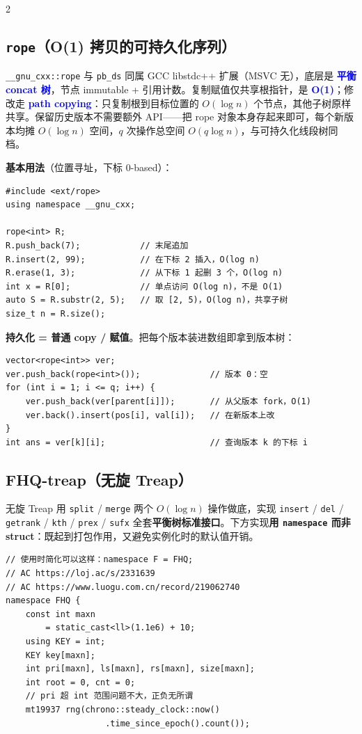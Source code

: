 \begin{multicols*}{2}
		\subsection{\texttt{rope}（O(1) 拷贝的可持久化序列）}

		\verb|__gnu_cxx::rope| 与 \verb|pb_ds| 同属 GCC libstdc++ 扩展（MSVC 无），底层是 \textcolor{blue}{\textbf{平衡 concat 树}}，节点 immutable + 引用计数。复制赋值仅共享根指针，是 \textcolor{blue}{\textbf{O(1)}}；修改走 \textcolor{blue}{\textbf{path copying}}：只复制根到目标位置的 $O(\log n)$ 个节点，其他子树原样共享。保留历史版本不需要额外 API——把 rope 对象本身存起来即可，每个新版本均摊 $O(\log n)$ 空间，$q$ 次操作总空间 $O(q \log n)$，与可持久化线段树同档。

		\textbf{基本用法}（位置寻址，下标 0-based）：

\begin{verbatim}
#include <ext/rope>
using namespace __gnu_cxx;

rope<int> R;
R.push_back(7);            // 末尾追加
R.insert(2, 99);           // 在下标 2 插入，O(log n)
R.erase(1, 3);             // 从下标 1 起删 3 个，O(log n)
int x = R[0];              // 单点访问 O(log n)，不是 O(1)
auto S = R.substr(2, 5);   // 取 [2, 5)，O(log n)，共享子树
size_t n = R.size();
\end{verbatim}

		\textbf{持久化 = 普通 copy / 赋值}。把每个版本装进数组即拿到版本树：

\begin{verbatim}
vector<rope<int>> ver;
ver.push_back(rope<int>());              // 版本 0：空
for (int i = 1; i <= q; i++) {
    ver.push_back(ver[parent[i]]);       // 从父版本 fork，O(1)
    ver.back().insert(pos[i], val[i]);   // 在新版本上改
}
int ans = ver[k][i];                     // 查询版本 k 的下标 i
\end{verbatim}

		\subsection{FHQ-treap（无旋 Treap）}

		无旋 Treap 用 \verb|split| / \verb|merge| 两个 $O(\log n)$ 操作做底，实现 \verb|insert| / \verb|del| / \verb|getrank| / \verb|kth| / \verb|prex| / \verb|sufx| 全套\textbf{平衡树标准接口}。下方实现\textbf{用 \texttt{namespace} 而非 struct}：既起到打包作用，又避免实例化时的默认值开销。

		\begin{verbatim}
// 使用时简化可以这样：namespace F = FHQ;
// AC https://loj.ac/s/2331639
// AC https://www.luogu.com.cn/record/219062740
namespace FHQ {
    const int maxn
        = static_cast<ll>(1.1e6) + 10;
    using KEY = int;
    KEY key[maxn];
    int pri[maxn], ls[maxn], rs[maxn], size[maxn];
    int root = 0, cnt = 0;
    // pri 超 int 范围问题不大，正负无所谓
    mt19937 rng(chrono::steady_clock::now()
                    .time_since_epoch().count());


\end{verbatim}
\end{multicols*}
